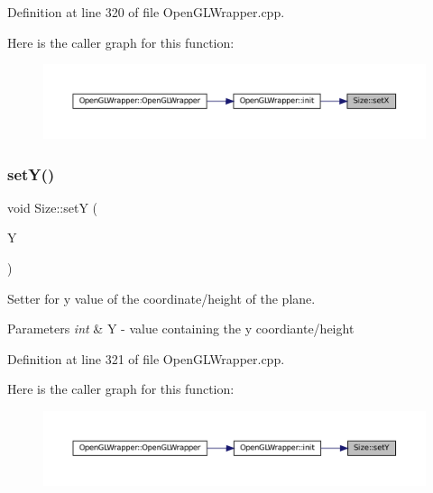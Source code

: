 Definition at line 320 of file Open\+G\+L\+Wrapper.\+cpp.

Here is the caller graph for this function\+:\nopagebreak
\begin{figure}[H]
\begin{center}
\leavevmode
\includegraphics[width=350pt]{classSize_a555a455ea033f7ec3173c9bda30a896d_icgraph}
\end{center}
\end{figure}
\mbox{\label{classSize_a75d2ff298be7d32a4e2d37f05b5f8c92}} 
\subsubsection{\texorpdfstring{setY()}{setY()}}
{\footnotesize\ttfamily void Size\+::setY (\begin{DoxyParamCaption}\item[{int}]{Y }\end{DoxyParamCaption})}



Setter for y value of the coordinate/height of the plane. 


\begin{DoxyParams}{Parameters}
{\em int} & Y -\/ value containing the y coordiante/height \\
\hline
\end{DoxyParams}


Definition at line 321 of file Open\+G\+L\+Wrapper.\+cpp.

Here is the caller graph for this function\+:\nopagebreak
\begin{figure}[H]
\begin{center}
\leavevmode
\includegraphics[width=350pt]{classSize_a75d2ff298be7d32a4e2d37f05b5f8c92_icgraph}
\end{center}
\end{figure}


